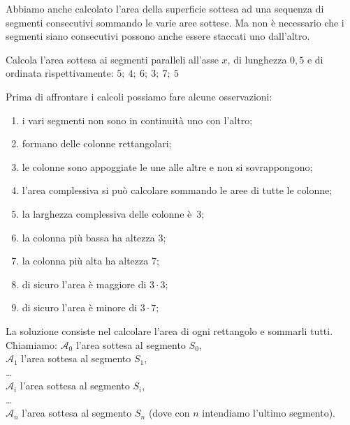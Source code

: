 Abbiamo anche calcolato l'area della superficie sottesa ad una sequenza di 
segmenti consecutivi sommando le varie aree sottese. Ma non è necessario che 
i segmenti siano consecutivi possono anche essere staccati uno dall'altro.

\begin{esempio}
Calcola l'area sottesa ai segmenti paralleli all'asse \(x\), di lunghezza 
\(0,5\) e di ordinata rispettivamente: \quad 
\(5;~4;~6;~3;~7;~5\)

\begin{minipage}{.29\textwidth}
\begin{inaccessibleblock}
  \areasottesasegmenti
\end{inaccessibleblock}
\end{minipage}
\hfill
\begin{minipage}{.69\textwidth}
Prima di affrontare i calcoli possiamo fare alcune osservazioni:
\begin{enumerate} [nosep]
 \item i vari segmenti non sono in continuità uno con l'altro;
 \item formano delle colonne rettangolari;
 \item le colonne sono appoggiate le une alle altre e non si sovrappongono;
 \item l'area complessiva si può calcolare sommando le aree di tutte le 
colonne;
 \item la larghezza complessiva delle colonne è~3;
 \item la colonna più bassa ha altezza 3;
 \item la colonna più alta ha altezza 7;
 \item di sicuro l'area è maggiore di \(3 \cdot 3\);
 \item di sicuro l'area è minore di \(3 \cdot 7\);
\end{enumerate}
\end{minipage}
\end{esempio}

La soluzione consiste nel calcolare l'area di ogni rettangolo e sommarli 
tutti.
Chiamiamo:
\(\mathcal{A}_0\) l'area sottesa al segmento \(S_0\),\\
\(\mathcal{A}_1\) l'area sottesa al segmento \(S_1\),\\
\dots\\
\(\mathcal{A}_i\) l'area sottesa al segmento \(S_i\),\\
\dots\\
\(\mathcal{A}_n\) l'area sottesa al segmento \(S_n\)
\quad
(dove con \(n\) intendiamo l'ultimo segmento).\\


